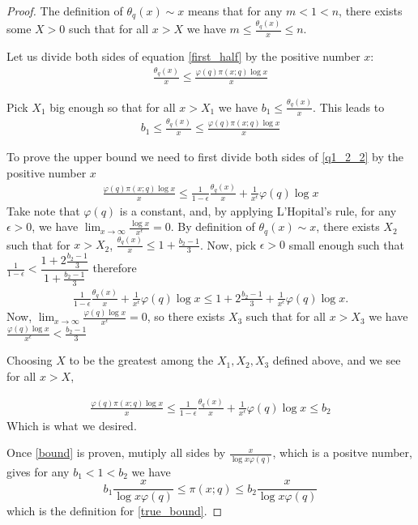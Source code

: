 \documentclass{article}
\theoremstyle{definition}
\theoremstyle{definition}
\theoremstyle{remark}
\begin{document}
\begin{proof}
	The definition of $\theta_q(x) \sim x$ means that for any $m < 1 < n$, there exists some $X > 0$ such that for all $x > X$ we have $m \leq \frac{\theta_q(x)}{x} \leq n$.

	Let us divide both sides of equation \eqref{first_half} by the positive number $x$:
	\begin{align*}
		\frac{\theta_q(x)}{x} \leq \frac{\varphi(q)\pi(x; q) \log x}{x}
	\end{align*}

	Pick $X_1$ big enough so that for all $x > X_1$ we have $b_1 \leq \frac{\theta_q(x)}{x}$. 
	This leads to
	\begin{align*}
		b_1 \leq \frac{\theta_q (x)}{x}
		\leq \frac{\varphi(q)\pi(x; q) \log x}{x}
	\end{align*}

	To prove the upper bound we need to first divide both sides of \eqref{q1_2_2} by the positive number $x$
	\begin{align*}
		\frac{\varphi(q)\pi(x; q) \log x}{x} \leq \frac{1}{1-\epsilon} \frac{\theta_q(x)}{x} + \frac{1}{x^{\epsilon}} \varphi(q) \log x
	\end{align*}
	Take note that $\varphi(q)$ is a constant, and, by applying L'Hopital's rule, for any $\epsilon > 0$, we have $\lim_{x \to \infty} \frac{\log x}{x^{\epsilon}} = 0$.
	By definition of $\theta_q(x) \sim x$, there exists $X_2$ such that for $x > X_2 $, $\frac{\theta_q(x)}{x} \leq 1 + \frac{b_2 - 1}{3}$. 
	Now, pick $\epsilon > 0$ small enough such that $\frac{1}{1-\epsilon} < \dfrac{1 + 2\frac{b_2 - 1}{3}}{1 + \frac{b_2 - 1}{3}}$
	therefore
	\begin{align*}
		\frac{1}{1-\epsilon} \frac{\theta_q(x)}{x} + \frac{1}{x^{\epsilon}} \varphi(q) \log x 
		\leq
		1 + 2\frac{ b_2 - 1}{3} + \frac{1}{x^{\epsilon}} \varphi(q) \log x .
	\end{align*}
	Now, $\lim_{x \to \infty} \frac{\varphi(q) \log x}{x^{\epsilon}} = 0$, so there exists $X_3$ such that for all $x > X_3$ we have $\frac{\varphi(q)\log x}{x^{\epsilon}} < \frac{b_2 - 1}{3}$

	Choosing $X$ to be the greatest among the $X_1, X_2, X_3$ defined above, and we see for all $x > X$,

	\begin{align*}
		\frac{\varphi(q)\pi(x; q) \log x}{x} \leq \frac{1}{1-\epsilon} \frac{\theta_q(x)}{x} + \frac{1}{x^{\epsilon}} \varphi(q) \log x
		\leq
		b_2
	\end{align*}
	Which is what we desired.

	Once \eqref{bound} is proven, mutiply all sides by $\frac{x}{\log x \varphi(q)}$, which is a positve number, gives for any $b_1 < 1 < b_2 $ we have 
	$$
		b_1 \frac{x }{\log x \varphi(q)} \leq 
		\pi(x; q)
		\leq b_2 \frac{x}{\log x \varphi(q)}
	$$
	which is the definition for \eqref{true_bound}.
\end{proof}
\end{document}
